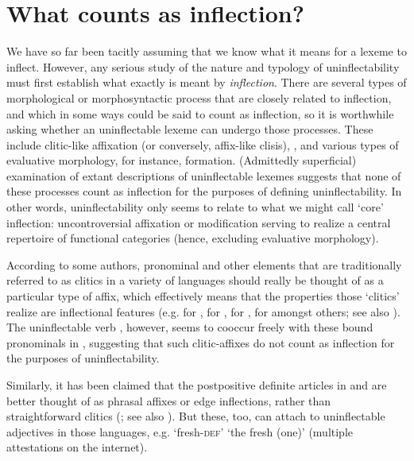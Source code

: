 \documentclass[output=paper,colorlinks,citecolor=brown]{langscibook}
\begin{document}
\section{What counts as inflection?} \label{sec:whatcounts}
We have so far been tacitly assuming that we know what it means for a lexeme to inflect. However, any  serious study of the nature and typology of uninflectability must first establish what exactly is meant by \textit{inflection}. There are several types of morphological or morphosyntactic process that are closely related to inflection, and which in some ways could be said to count as inflection, so it is worthwhile asking whether an uninflectable lexeme can undergo those processes. These include clitic-like affixation (or conversely, affix-like clisis), , and various types of evaluative morphology, for instance,  formation. (Admittedly  superficial) examination of extant descriptions of uninflectable lexemes suggests that none of these processes count as inflection for the purposes of defining uninflectability. In other words, uninflectability only seems to relate to what we might call `core' inflection: uncontroversial affixation or  modification serving to realize a central repertoire of functional categories (hence, excluding evaluative morphology). 

According to some authors, pronominal and other elements that are traditionally referred to as clitics in a variety of languages should really be thought of as a particular type of affix, which effectively means that the properties those `clitics' realize are inflectional features (e.g. \citealp{monachesi1999} for ,  \citealp{joseph1988} for ,  \citealp{lyons1991} for , \citealp{millersag1997,bonami2007} for  amongst others; see also \citealp{spencerluis2012}). The uninflectable  verb , however, seems to cooccur freely with these bound pronominals in , suggesting that such clitic-affixes do not count as inflection for the purposes of uninflectability.

Similarly, it has been claimed that the postpositive definite articles in  and  are better thought of as phrasal affixes or edge inflections, rather than straightforward clitics (\citealp{sadock1991, halpern1995}; see also \citealp[129]{spencerluis2012}). But these, too, can attach to uninflectable adjectives in those languages, e.g.    `fresh-\textsc{def}' `the fresh (one)' (multiple attestations on the internet). 
\end{document}
